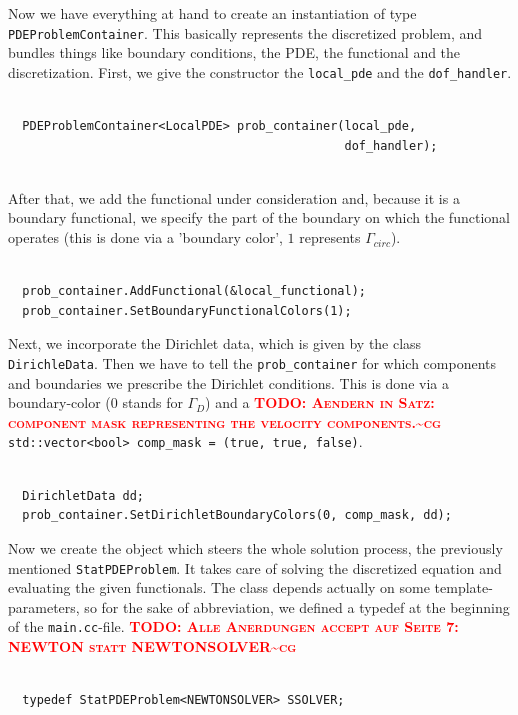 \documentclass[prodmode,acmtoms]{acmsmall}
\numberwithin{equation}{section}
\newcommand{\todocg}[1]{\textbf{\textsc{\textcolor{red}{TODO: #1\textasciitilde cg}}}}
\begin{document}
Now we have everything at hand to create an instantiation of type \texttt{PDEProblemContainer}. This basically represents the discretized problem, and bundles things like boundary conditions, the PDE, the functional and the discretization. First, we give the constructor the \texttt{local\_pde} and the \texttt{dof\_handler}.
\begin{lstlisting}

  PDEProblemContainer<LocalPDE> prob_container(local_pde,
                                               dof_handler);
                                               
\end{lstlisting}
After that, we add the functional under consideration and, because it is a boundary functional, we specify the part of the boundary on which the functional operates (this is done via a 'boundary color', $1$ represents $\Gamma_{circ}$).
\begin{lstlisting}

  prob_container.AddFunctional(&local_functional);
  prob_container.SetBoundaryFunctionalColors(1);

\end{lstlisting}
Next, we incorporate the Dirichlet data, which is given by the class
\texttt{DirichleData}. Then we have to tell the \texttt{prob\_container} for
which components and boundaries we prescribe the Dirichlet conditions. This is
done via a boundary-color (0 stands for $\Gamma_D$) and a 
\todocg{Aendern in Satz: component mask representing the velocity components.} \texttt{std::vector<bool> comp\_mask = (true, true, false)}.
\begin{lstlisting}

  DirichletData dd;
  prob_container.SetDirichletBoundaryColors(0, comp_mask, dd);

\end{lstlisting}
Now we create the object which steers the whole solution process, the previously mentioned \texttt{StatPDEProblem}. It takes care of solving the discretized equation and evaluating the given functionals. The class depends actually on some template-parameters, so for the sake of abbreviation, we defined a typedef at the beginning of the \texttt{main.cc}-file.
\todocg{Alle Anerdungen accept auf Seite 7: NEWTON statt NEWTONSOLVER}
\begin{lstlisting}

  typedef StatPDEProblem<NEWTONSOLVER> SSOLVER;

\end{lstlisting}
\end{document}
